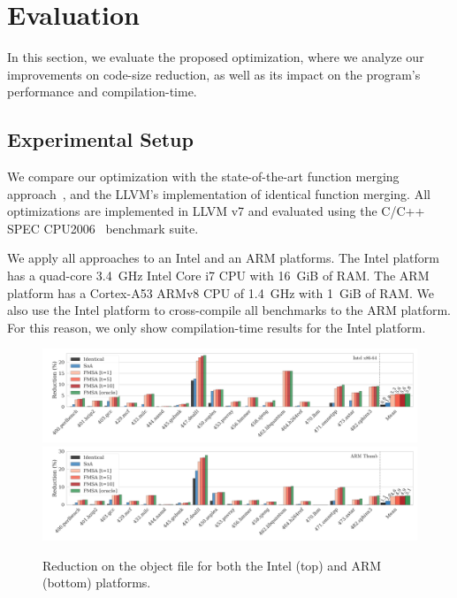 \section{Evaluation}


In this section, we evaluate the proposed optimization, where we analyze our
improvements on code-size reduction, as well as its impact on the program's
performance and compilation-time.



\subsection{Experimental Setup}
We compare our optimization with the state-of-the-art function merging approach~\cite{edler14}, and the LLVM's implementation of identical
function merging. All optimizations are implemented in LLVM v7 and evaluated using the C/C++ SPEC CPU2006~\cite{spec} benchmark suite.

We apply all approaches to an Intel and an ARM platforms. The Intel platform has a quad-core 3.4~GHz Intel Core i7 CPU with 16~GiB of RAM.
The ARM platform has a Cortex-A53 ARMv8 CPU of 1.4~GHz with 1~GiB of RAM.
We also use the Intel platform to cross-compile all benchmarks to the ARM
platform.
For this reason, we only show compilation-time results for the Intel platform.

\begin{figure}[t!]
  \centering
  \includegraphics[width=\linewidth]{figs/reduction-obj-intel-label.pdf} \\
  \vspace{-1.8ex}
  \includegraphics[width=\linewidth]{figs/reduction-obj-arm-label.pdf}
  \vspace{-4ex}
  \caption{Reduction on the object file for both the Intel (top) and ARM (bottom) platforms.}
  \label{fig:reduction-obj}
\end{figure}


